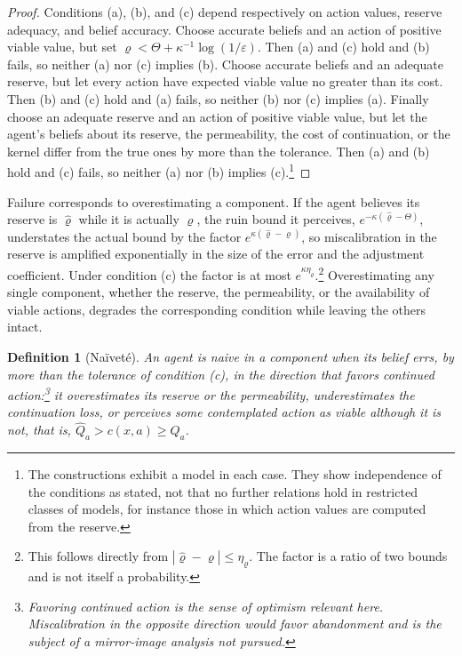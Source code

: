 \documentclass[11pt]{article}
\newtheorem{definition}{Definition}
\theoremstyle{remark}
\begin{document}
\begin{proof}
Conditions (a), (b), and (c) depend respectively on action values, reserve adequacy, and belief accuracy. Choose accurate beliefs and an action of positive viable value, but set $\varrho<\Theta+\kappa^{-1}\log(1/\varepsilon)$. Then (a) and (c) hold and (b) fails, so neither (a) nor (c) implies (b). Choose accurate beliefs and an adequate reserve, but let every action have expected viable value no greater than its cost. Then (b) and (c) hold and (a) fails, so neither (b) nor (c) implies (a). Finally choose an adequate reserve and an action of positive viable value, but let the agent's beliefs about its reserve, the permeability, the cost of continuation, or the kernel differ from the true ones by more than the tolerance. Then (a) and (b) hold and (c) fails, so neither (a) nor (b) implies (c).\footnote{The constructions exhibit a model in each case. They show independence of the conditions as stated, not that no further relations hold in restricted classes of models, for instance those in which action values are computed from the reserve.}
\end{proof}

Failure corresponds to overestimating a component. If the agent believes its reserve is $\hat\varrho$ while it is actually $\varrho$, the ruin bound it perceives, $e^{-\kappa(\hat\varrho-\Theta)}$, understates the actual bound by the factor $e^{\kappa(\hat\varrho-\varrho)}$, so miscalibration in the reserve is amplified exponentially in the size of the error and the adjustment coefficient. Under condition (c) the factor is at most $e^{\kappa\eta_\varrho}$.\footnote{This follows directly from $|\hat\varrho-\varrho|\le\eta_\varrho$. The factor is a ratio of two bounds and is not itself a probability.} Overestimating any single component, whether the reserve, the permeability, or the availability of viable actions, degrades the corresponding condition while leaving the others intact.

\begin{definition}[Na\"ivet\'e]
An agent is \emph{naive} in a component when its belief errs, by more than the tolerance of condition (c), in the direction that favors continued action:\footnote{Favoring continued action is the sense of optimism relevant here. Miscalibration in the opposite direction would favor abandonment and is the subject of a mirror-image analysis not pursued.} it overestimates its reserve or the permeability, underestimates the continuation loss, or perceives some contemplated action as viable although it is not, that is, $\hat Q_a>c(x,a)\ge Q_a$.
\end{definition}
\end{document}
